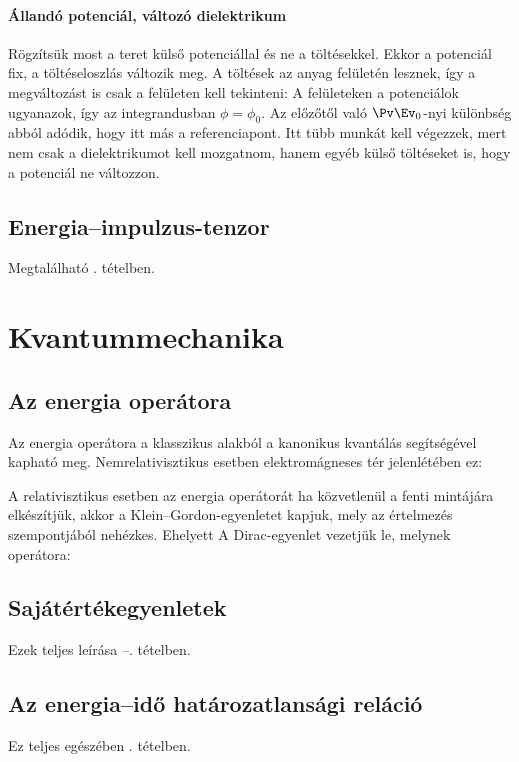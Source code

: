    \paragraph{Állandó potenciál, változó dielektrikum}
    
    Rögzítsük most a teret külső potenciállal és ne a töltésekkel.
   Ekkor a  potenciál fix, a töltéseloszlás változik meg.
   A töltések az anyag felületén lesznek, így a megváltozást is csak a felületen kell tekinteni:
    A felületeken a potenciálok ugyanazok, így az integrandusban $\phi=\phi_0$. 
    Az előzőtől való $\Pv\Ev_0$-nyi különbség abból adódik, hogy itt más a referenciapont.
   Itt tübb munkát kell végezzek, mert nem csak a dielektrikumot kell mozgatnom, hanem egyéb külső töltéseket is, hogy a potenciál ne változzon. 

  \subsection{Energia--impulzus-tenzor}
   
   Megtalálható . tételben.
    
 \section{Kvantummechanika}
  
  \subsection{Az energia operátora}
   
   Az energia operátora a klasszikus alakból a kanonikus kvantálás segítségével kapható meg.
   Nemrelativisztikus esetben elektromágneses tér jelenlétében ez:
   
   A relativisztikus esetben az energia operátorát ha közvetlenül a fenti mintájára elkészítjük, akkor a Klein--Gordon-egyenletet kapjuk, mely az értelmezés szempontjából nehézkes.
   Ehelyett A Dirac-egyenlet vezetjük le, melynek operátora:
   
  \subsection{Sajátértékegyenletek}
   
   Ezek teljes leírása --. tételben.
   
  \subsection{Az energia--idő határozatlansági reláció}
    
   Ez teljes egészében . tételben.
